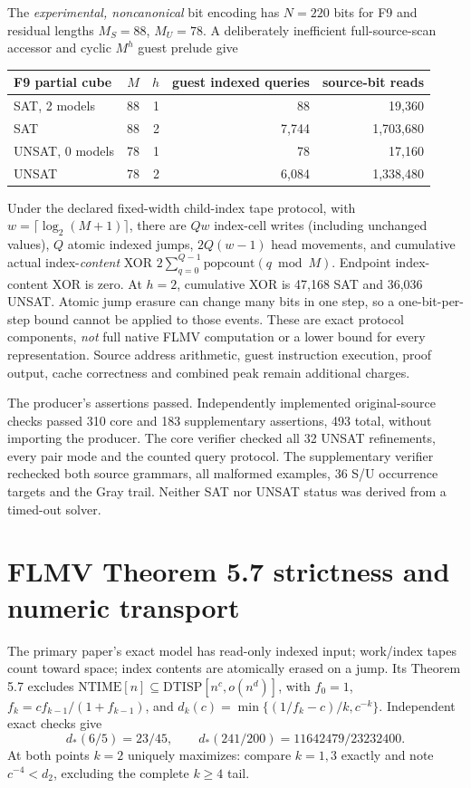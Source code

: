 \documentclass[11pt]{article}
\begin{document}
The \emph{experimental, noncanonical} bit encoding has $N=220$ bits for F9 and residual lengths $M_S=88$, $M_U=78$. A deliberately inefficient full-source-scan accessor and cyclic $M^h$ guest prelude give
\begin{center}
\begin{tabular}{lrrrr}\toprule
F9 partial cube & $M$ & $h$ & guest indexed queries & source-bit reads\\\midrule
SAT, 2 models&88&1&88&19,360\\
SAT&88&2&7,744&1,703,680\\
UNSAT, 0 models&78&1&78&17,160\\
UNSAT&78&2&6,084&1,338,480\\\bottomrule
\end{tabular}
\end{center}
Under the declared fixed-width child-index tape protocol, with $w=\lceil\log_2(M+1)\rceil$, there are $Qw$ index-cell writes (including unchanged values), $Q$ atomic indexed jumps, $2Q(w-1)$ head movements, and cumulative actual index-\emph{content} XOR $2\sum_{q=0}^{Q-1}\mathrm{popcount}(q\bmod M)$. Endpoint index-content XOR is zero. At $h=2$, cumulative XOR is 47,168 SAT and 36,036 UNSAT. Atomic jump erasure can change many bits in one step, so a one-bit-per-step bound cannot be applied to those events. These are exact protocol components, \emph{not} full native FLMV computation or a lower bound for every representation. Source address arithmetic, guest instruction execution, proof output, cache correctness and combined peak remain additional charges.

The producer's assertions passed. Independently implemented original-source checks passed 310 core and 183 supplementary assertions, 493 total, without importing the producer. The core verifier checked all 32 UNSAT refinements, every pair mode and the counted query protocol. The supplementary verifier rechecked both source grammars, all malformed examples, 36 S/U occurrence targets and the Gray trail. Neither SAT nor UNSAT status was derived from a timed-out solver.

\section{FLMV Theorem 5.7 strictness and numeric transport}
The primary paper's exact model has read-only indexed input; work/index tapes count toward space; index contents are atomically erased on a jump. Its Theorem 5.7 excludes $\mathrm{NTIME}[n]\subseteq \mathrm{DTISP}[n^c,o(n^d)]$, with $f_0=1$, $f_k=cf_{k-1}/(1+f_{k-1})$, and $d_k(c)=\min\{(1/f_k-c)/k,c^{-k}\}$. Independent exact checks give
\[
d_*(6/5)=23/45,\qquad
d_*(241/200)=11642479/23232400.
\]
At both points $k=2$ uniquely maximizes: compare $k=1,3$ exactly and note $c^{-4}<d_2$, excluding the complete $k\ge4$ tail.
\end{document}
